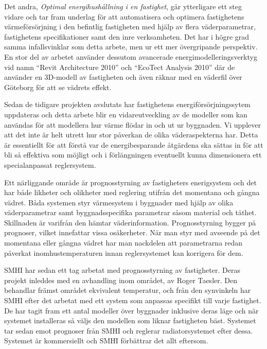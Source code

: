 Det andra, \textit{Optimal energihushållning i en fastighet}\cite{kandidatarbete2010},
går ytterligare ett steg vidare och tar fram underlag för att automatisera och
optimera fastighetens värmeförsörjning i den befintlig fastigheten med hjälp av
flera väderparametrar, fastighetens specifikationer samt den inre verksamheten. Det har i högre grad samma infallsvinklar som detta arbete, men ur ett mer övergripande perspektiv. En stor del av arbetet använder dessutom avancerade energimodelleringsverktyg vid namn ``Revit Architecture 2010'' och 
``EcoTect Analysis 2010'' där de använder en 3D-modell av fastigheten och även
räknar med en väderfil över Göteborg för att se vädrets effekt.

Sedan de tidigare projekten avslutats har fastighetens energiförsörjningssytem uppdateras och detta arbete blir en vidareutveckling av de modeller som kan användas för att modellera hur värme flödar in och ut ur byggnaden. Vi upplever att det inte är helt utrett hur stor påverkan de olika väderaspekterna har. Detta är essentiellt för att förstå var de energibesparande åtgärdena ska sättas in för att bli så effektiva som möjligt och i förlängningen eventuellt kunna dimensionera ett specialanpassat reglersystem.

Ett närliggande område är prognosstyrning av fastigheters enerigsystem och det har både likheter och olikheter med reglering utifrån det momentana och gångna vädret. Båda systemen styr värmesystem i byggnader med hjälp av olika väderparametrar samt byggnadsspecifika parametrar såsom material och täthet. Skillnaden är varifrån den hämtar väderinformation. Prognosstyrning bygger på prognoser, vilket innefattar vissa osäkerheter. När man styr med avseende på det momentana eller gångna vädret har man nackdelen att parametrarna redan påverkat inomhustemperaturen innan reglersystemet kan korrigera för dem.

SMHI har sedan ett tag arbetat med prognosstyrning av fastigheter. Deras projekt inleddes med en avhandling inom området, av Roger Taesler. Den behandlar främst området ekvivalent temperatur, och från den synvinkeln har SMHI efter det arbetat med ett system som anpassas specifikt till varje fastighet. De har tagit fram ett antal modeller över byggnader inklusive deras läge och när systemet installeras så väljs den modellen som liknar fastigheten bäst. Systemet tar sedan emot prognoser från SMHI och reglerar radiatorsystemet efter dessa. Systemet är kommersiellt och SMHI förbättrar det allt eftersom.







